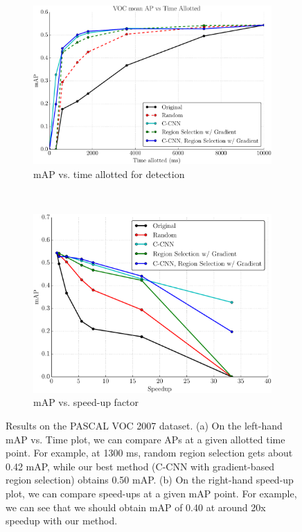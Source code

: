 \begin{figure}[ht]
\centering
\begin{subfigure}[b]{.75\linewidth}
    \includegraphics[width=\linewidth]{../ccnn/figures/_apvst_final.pdf}
    \caption{mAP vs. time allotted for detection}\label{fig:apvst}
\end{subfigure}\\
\begin{subfigure}[b]{.75\linewidth}
    \includegraphics[width=\linewidth]{../ccnn/figures/_speedup_final_abs.pdf}
    \caption{mAP vs. speed-up factor}\label{fig:speedup}
\end{subfigure}
\caption[
Results on the PASCAL VOC 2007 dataset.]{
Results on the PASCAL VOC 2007 dataset.
(a) On the left-hand mAP vs. Time plot, we can compare APs at a given allotted time point.
For example, at 1300 ms, random region selection gets about 0.42 mAP, while our best method (C-CNN with gradient-based region selection) obtains 0.50 mAP.
(b) On the right-hand speed-up plot, we can compare speed-ups at a given mAP point.
For example, we can see that we should obtain mAP of 0.40 at around 20x speedup with our method.
}\label{fig:voc2007_results}
\end{figure}
